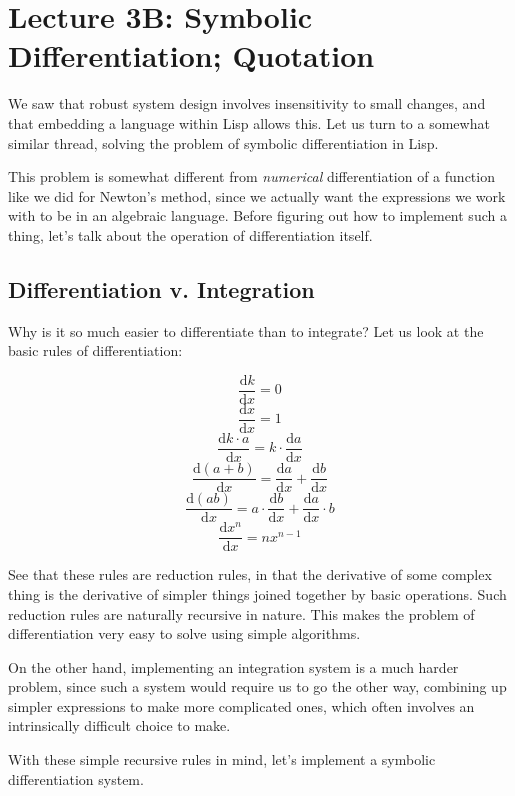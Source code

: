 \documentclass[9pt]{report}
\begin{document}
\chapter{Lecture 3B: Symbolic Differentiation; Quotation}
\label{sec:org0524aec}

We saw that robust system design involves insensitivity to small
changes, and that embedding a language within Lisp allows this. Let
us turn to a somewhat similar thread, solving the problem of
symbolic differentiation in Lisp.

This problem is somewhat different from \emph{numerical} differentiation
of a function like we did for Newton's method, since we actually
want the expressions we work with to be in an algebraic language.
Before figuring out how to implement such a thing, let's talk about
the operation of differentiation itself.

\section{Differentiation v. Integration}
\label{sec:org0b262de}

Why is it so much easier to differentiate than to integrate?
Let us look at the basic rules of differentiation:

$$\frac{\mathrm{d}k}{\mathrm{d}x} = 0$$
$$\frac{\mathrm{d}x}{\mathrm{d}x} = 1$$
$$\frac{\mathrm{d}k\cdot a}{\mathrm{d}x} = k\cdot \frac{\mathrm{d}a}{\mathrm{d}x}$$
$$\frac{\mathrm{d}(a+b)}{\mathrm{d}x} =
   \frac{\mathrm{d}a}{\mathrm{d}x} + \frac{\mathrm{d}b}{\mathrm{d}x}$$
$$\frac{\mathrm{d}(ab)}{\mathrm{d}x} =  a\cdot
   \frac{\mathrm{d}b}{\mathrm{d}x} +
   \frac{\mathrm{d}a}{\mathrm{d}x}\cdot b$$
$$\frac{\mathrm{d}x^{n}}{\mathrm{d}x} = nx^{n-1}$$

See that these rules are reduction rules, in that the derivative of
some complex thing is the derivative of simpler things joined
together by basic operations. Such reduction rules are naturally
recursive in nature. This makes the problem of differentiation very
easy to solve using simple algorithms.

On the other hand, implementing an integration system is a much
harder problem, since such a system would require us to go the
other way, combining up simpler expressions to make more
complicated ones, which often involves an intrinsically difficult
choice to make.

With these simple recursive rules in mind, let's implement a
symbolic differentiation system.
\end{document}
